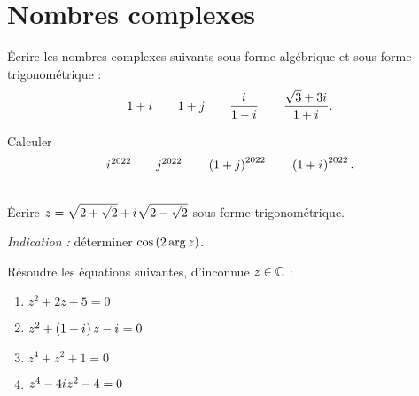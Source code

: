 \chapter{Nombres complexes}

\minitoc

\begin{exo}[Exercice 1]
Écrire les nombres complexes suivants sous forme algébrique et sous forme trigonométrique : \[1+i\mkern1mu\qquad1+j\qquad\dfrac{i\mkern1mu}{1-i\mkern1mu}\qquad\dfrac{\sqrt{3}+3i\mkern1mu}{1+i\mkern1mu}.\]
\end{exo}

\begin{corr}
\end{corr}

\begin{exo}[Exercice 2]
Calculer \[i\mkern1mu^{2022}\qquad j^{2022}\qquad\left(1+j\right)^{2022}\qquad\left(1+i\mkern1mu\right)^{2022}.\]
\end{exo}

\begin{corr}
\end{corr}

\begin{exo}[Exercice 3]~\\
Écrire \(z=\sqrt{2+\sqrt{2}}+i\mkern1mu\sqrt{2-\sqrt{2}}\) sous forme trigonométrique.

\textit{Indication :} déterminer \(\cos\left(2\arg z\right)\).
\end{exo}

\begin{corr}
\end{corr}

\begin{exo}[Exercice 4]
Résoudre les équations suivantes, d'inconnue \(z\in\mathbb{C}\) :

\begin{enumerate}
\item \(z^2+2z+5=0\) \\

\item \(z^2+\left(1+i\mkern1mu\right)z-i\mkern1mu=0\) \\

\item \(z^4+z^2+1=0\) \\

\item \(z^4-4i\mkern1mu z^2-4=0\)
\end{enumerate}
\end{exo}

\begin{corr}
\end{corr}

